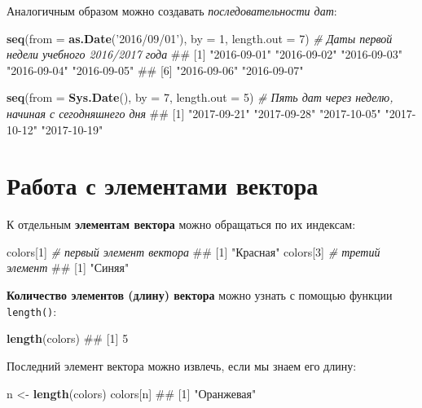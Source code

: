 \documentclass[]{book}
\newenvironment{Shaded}{\begin{snugshade}}{\end{snugshade}}
\newcommand{\KeywordTok}[1]{\textcolor[rgb]{0.13,0.29,0.53}{\textbf{#1}}}
\newcommand{\DataTypeTok}[1]{\textcolor[rgb]{0.13,0.29,0.53}{#1}}
\newcommand{\DecValTok}[1]{\textcolor[rgb]{0.00,0.00,0.81}{#1}}
\newcommand{\StringTok}[1]{\textcolor[rgb]{0.31,0.60,0.02}{#1}}
\newcommand{\CommentTok}[1]{\textcolor[rgb]{0.56,0.35,0.01}{\textit{#1}}}
\newcommand{\NormalTok}[1]{#1}
\begin{document}
Аналогичным образом можно создавать \emph{последовательности дат}:

\begin{Shaded}
\begin{Highlighting}[]
\KeywordTok{seq}\NormalTok{(}\DataTypeTok{from =} \KeywordTok{as.Date}\NormalTok{(}\StringTok{'2016/09/01'}\NormalTok{), }\DataTypeTok{by =} \DecValTok{1}\NormalTok{, }\DataTypeTok{length.out =} \DecValTok{7}\NormalTok{) }\CommentTok{# Даты первой недели учебного 2016/2017 года}
\NormalTok{## [1] "2016-09-01" "2016-09-02" "2016-09-03" "2016-09-04" "2016-09-05"}
\NormalTok{## [6] "2016-09-06" "2016-09-07"}

\KeywordTok{seq}\NormalTok{(}\DataTypeTok{from =} \KeywordTok{Sys.Date}\NormalTok{(), }\DataTypeTok{by =} \DecValTok{7}\NormalTok{, }\DataTypeTok{length.out =} \DecValTok{5}\NormalTok{) }\CommentTok{# Пять дат через неделю, начиная с сегодняшнего дня}
\NormalTok{## [1] "2017-09-21" "2017-09-28" "2017-10-05" "2017-10-12" "2017-10-19"}
\end{Highlighting}
\end{Shaded}

\section{Работа с элементами вектора}\label{---}

К отдельным \textbf{элементам вектора} можно обращаться по их индексам:

\begin{Shaded}
\begin{Highlighting}[]
\NormalTok{colors[}\DecValTok{1}\NormalTok{] }\CommentTok{# первый элемент вектора}
\NormalTok{## [1] "Красная"}
\NormalTok{colors[}\DecValTok{3}\NormalTok{] }\CommentTok{# третий элемент}
\NormalTok{## [1] "Синяя"}
\end{Highlighting}
\end{Shaded}

\textbf{Количество элементов (длину) вектора} можно узнать с помощью
функции \texttt{length()}:

\begin{Shaded}
\begin{Highlighting}[]
\KeywordTok{length}\NormalTok{(colors)}
\NormalTok{## [1] 5}
\end{Highlighting}
\end{Shaded}

Последний элемент вектора можно извлечь, если мы знаем его длину:

\begin{Shaded}
\begin{Highlighting}[]
\NormalTok{n <-}\StringTok{ }\KeywordTok{length}\NormalTok{(colors)}
\NormalTok{colors[n]}
\NormalTok{## [1] "Оранжевая"}
\end{Highlighting}
\end{Shaded}
\end{document}
